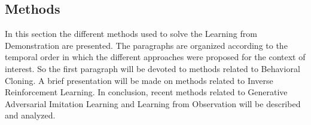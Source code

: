 \subsection{Methods}
In this section the different methods used to solve the Learning from Demonstration are presented. The paragraphs are organized according to the temporal order in which the different approaches were proposed for the context of interest. So the first paragraph will be devoted to methods related to Behavioral Cloning. A brief presentation will be made on methods related to Inverse Reinforcement Learning. In conclusion, recent methods related to Generative Adversarial Imitation Learning and Learning from Observation will be described and analyzed.
\label{sec:methods}



